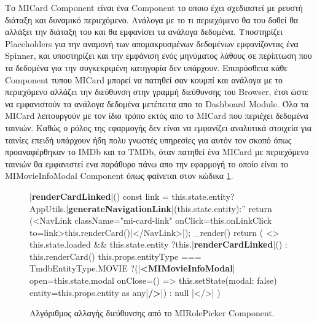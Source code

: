 Το MICard Component είναι ένα Component το οποιο έχει σχεδιαστεί με ρευστή διάταξη και δυναμικό περιεχόμενο. Ανάλογα με το τι περιεχόμενο θα του δοθεί θα αλλάξει την διάταξη του και θα εμφανίσει τα ανάλογα δεδομένα. Υποστηρίζει Placeholders για την αναμονή των απομακρυσμένων δεδομένων εμφανίζοντας ένα Spinner, και υποστηρίζει και την εμφάνιση ενός μηνύματος λάθους σε περίπτωση που τα δεδομένα για την συγκεκριμένη κατηγορία δεν υπάρχουν. Επιπρόσθετα κάθε Component τυπου MICard μπορεί να πατηθεί σαν κουμπί και ανάλογα με το περιεχόμενο αλλάζει την διεύθυνση στην γραμμή διεύθυνσης του Browser, έτσι ώστε να εμφανιστούν τα ανάλογα δεδομένα μετέπειτα απο το Dashboard Module. Όλα τα MICard λειτουργούν με τον ίδιο τρόπο εκτός απο το MICard που περιέχει δεδομένα ταινιών. Καθώς ο ρόλος της εφαρμογής δεν είναι να εμφανίζει αναλυτικά στοιχεία για ταινίες επειδή υπάρχουν ήδη πολυ γνωστές υπηρεσίες για αυτόν τον σκοπό όπως προαναφέρθηκαν το IMDb και το TMDb, όταν πατηθεί ένα MICard με περιεχόμενο ταινιών θα εμφανιστεί ενα παράθυρο πάνω απο την εφαρμογή το οποίο είναι το MIMovieInfoModal Component όπως φαίνεται στον κώδικα \ref{code:micard_click}.
\begin{figure}[H]
    \begin{TypeScriptcode}
|\textbf{renderCardLinked}|() {
  const link = this.state.entity?AppUtils.|\textbf{generateNavigationLink}|(this.state.entity):''
  return (<NavLink className="mi-card-link" onClick={this.onLinkClick} to={link}>{this.renderCard()}|</NavLink>|);
}
_render() {
  return (
    <>
      {this.state.loaded && this.state.entity ?this.|\textbf{renderCardLinked}|() : this.renderCard()}
      {this.props.entityType === TmdbEntityType.MOVIE ?(|\textbf{<MIMovieInfoModal}| open={this.state.modal} onClose={() => this.setState({modal: false})} entity={this.props.entity as any}|\textbf{/>}|) : null}
    |</>|
  )
}
    \end{TypeScriptcode}
    \caption{Αλγόριθμος αλλαγής διεύθυνσης από το MIRolePicker Component.}
   \label{code:micard_click}
\end{figure}
